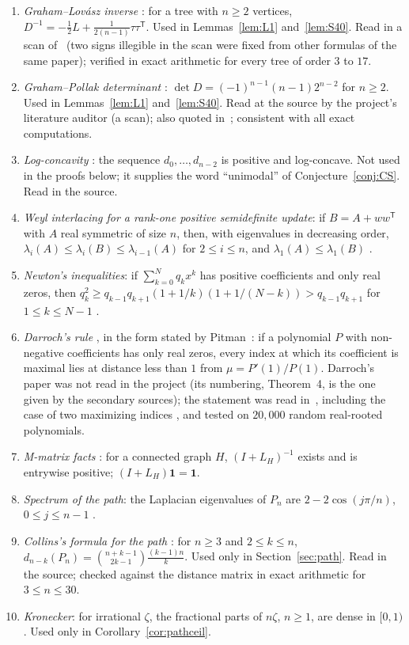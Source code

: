 \documentclass[11pt]{amsart}
\theoremstyle{definition}
\theoremstyle{remark}
\newcommand{\one}{\mathbf 1}
\newcommand{\T}{\mathsf T}
\begin{document}
\begin{enumerate}
\item[(GL)] \emph{Graham--Lov\'asz inverse} \cite[Lemma~1, p.~66]{GL78}: for
a tree with $n\ge2$ vertices, $D^{-1}=-\frac12L+\frac{1}{2(n-1)}\tau\tau^\T$.
Used in Lemmas~\ref{lem:L1} and~\ref{lem:S40}. Read in a scan of~\cite{GL78}
(two signs illegible in the scan were fixed from other formulas of the same
paper); verified in exact arithmetic for every tree of order $3$ to $17$.
\item[(GP)] \emph{Graham--Pollak determinant} \cite[proof of Theorem~3,
pp.~2509--2511]{GP71}: $\det D=(-1)^{n-1}(n-1)2^{n-2}$ for $n\ge2$. Used in
Lemmas~\ref{lem:L1} and~\ref{lem:S40}. Read at the source by the project's
literature auditor (a scan); also quoted in~\cite{AAB}; consistent with all
exact computations.
\item[(LC)] \emph{Log-concavity} \cite[Theorem~2.1]{AAB}: the sequence
$d_0,\dots,d_{n-2}$ is positive and log-concave. Not used in the proofs below;
it supplies the word ``unimodal'' of Conjecture~\ref{conj:CS}. Read in the
source.
\item[(W)] \emph{Weyl interlacing for a rank-one positive semidefinite
update}: if $B=A+ww^\T$ with $A$ real symmetric of size $n$, then, with
eigenvalues in decreasing order, $\lambda_i(A)\le\lambda_i(B)\le\lambda_{i-1}(A)$
for $2\le i\le n$, and $\lambda_1(A)\le\lambda_1(B)$ \cite{HJ}.
\item[(N)] \emph{Newton's inequalities}: if $\sum_{k=0}^Nq_kx^k$ has positive
coefficients and only real zeros, then
$q_k^2\ge q_{k-1}q_{k+1}(1+1/k)(1+1/(N-k))>q_{k-1}q_{k+1}$ for $1\le k\le N-1$
\cite{HLP}.
\item[(D)] \emph{Darroch's rule} \cite[Theorem~4]{Dar64}, in the form stated
by Pitman~\cite[p.~284]{Pit97}: if a polynomial $P$ with non-negative
coefficients has only real zeros, every index at which its coefficient is
maximal lies at distance less than $1$ from $\mu=P'(1)/P(1)$. Darroch's paper
was not read in the project (its numbering, Theorem~4, is the one given by
the secondary sources); the statement was read in~\cite{Pit97},
including the case of two maximizing indices \cite[eq.~(13)]{Pit97}, and
tested on $20{,}000$ random real-rooted polynomials.
\item[(M)] \emph{M-matrix facts} \cite{BP}: for a connected graph $H$,
$(I+L_H)^{-1}$ exists and is entrywise positive; $(I+L_H)\one=\one$.
\item[(PS)] \emph{Spectrum of the path}: the Laplacian eigenvalues of $P_n$
are $2-2\cos(j\pi/n)$, $0\le j\le n-1$ \cite{BH}.
\item[(C)] \emph{Collins's formula for the path} \cite[Theorem~3 and its
proof, p.~31]{Col89}: for $n\ge3$ and $2\le k\le n$,
$d_{n-k}(P_n)=\binom{n+k-1}{2k-1}\frac{(k-1)n}{k}$. Used only in
Section~\ref{sec:path}. Read in the source; checked against the distance
matrix in exact arithmetic for $3\le n\le30$.
\item[(Kr)] \emph{Kronecker}: for irrational $\zeta$, the fractional parts of
$n\zeta$, $n\ge1$, are dense in $[0,1)$. Used only in
Corollary~\ref{cor:pathceil}.
\end{enumerate}
\end{document}
